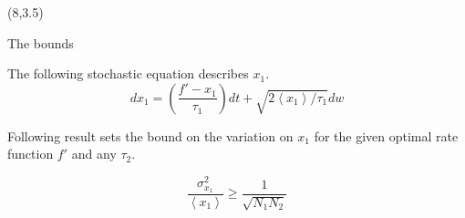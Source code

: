 \documentclass{beamer}
\begin{document}
\begin{textblock}{7}(8,3.5)

    \begin{block}{The bounds}

        The following stochastic equation describes $x_1$.
        \def\mean#1{\left< #1 \right>}
        \begin{equation}
            dx_1 = (\frac{f'-x_1}{\tau _1}) dt + \sqrt{2\mean{x_1}/\tau_1}dw
        \end{equation}

        Following result \cite{paulsson} sets the bound on the variation on
        $x_1$ for the given optimal rate function $f'$ and any $\tau_2$.

        \begin{equation}
            \frac{\sigma_{x_1}^2}{\mean{x_1}} \geq \frac{1}{\sqrt{N_1N_2}}
        \end{equation}

    \end{block}
 
\end{textblock}
\end{document}
